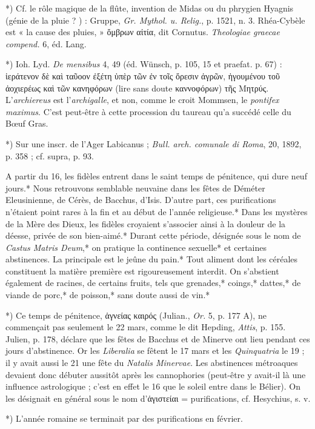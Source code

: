 \documentclass[a4paper, 11pt, oneside, polutonikogreek, french]{article}
\begin{document}
*) Cf. le rôle magique de la flûte, invention de Midas ou du phrygien Hyagnis (génie de la pluie ? ) : Gruppe, \emph{Gr. Mythol. u. Relig.}, p. 1521, n. 3. Rhéa-Cybèle est « la cause des pluies, » ὄμβρων αἰτία, dit Cornutus. \emph{Theologiae graecae compend.} 6, éd. Lang.

*) Ioh. Lyd. \emph{De mensibus} 4, 49 (éd. Wünsch, p. 105, 15 et praefat. p. 67) : ἱεράτενον δὲ καὶ ταῦοον ἐξέτη ὑπὲρ τῶν ἐν τοῖς ὄρεσιν ἀγρῶν, ἡγουμένου τοῦ ἀοχιερέως καὶ τῶν κανηφόρων (lire sans doute καννοφόρων) τῆς Mητρύς. L'\emph{archiereus} est l'\emph{archigalle}, et non, comme le croit Mommsen, le \emph{pontifex maximus}. C'est peut-être à cette procession du taureau qu'a succédé celle du Bœuf Gras.

*) Sur une inscr. de l'Ager Labicanus ; \emph{Bull. arch. comunale di Roma}, 20, 1892, p. 358 ; cf. supra, p. 93.

A partir du 16, les fidèles entrent dans le saint temps de pénitence, qui dure neuf jours.* Nous retrouvons semblable neuvaine dans les fêtes de Déméter Eleusinienne, de Cérès, de Bacchus, d'Isis. D'autre part, ces purifications n'étaient point rares à la fin et au début de l'année religieuse.* Dans les mystères de la Mère des Dieux, les fidèles croyaient s'associer ainsi à la douleur de la déesse, privée de son bien-aimé.* Durant cette période, désignée sous le nom de \emph{Castus Matris Deum},* on pratique la continence sexuelle* et certaines abstinences. La principale est le jeûne du pain.* Tout aliment dont les céréales constituent la matière première est rigoureusement interdit. On s'abstient également de racines, de certains fruits, tels que grenades,* coings,* dattes,* de viande de porc,* de poisson,* sans doute aussi de vin.*

*) Ce temps de pénitence, ἁγνείας καιρός (Julian., \emph{Or.} 5, p. 177 A), ne commençait pas seulement le 22 mars, comme le dit Hepding, \emph{Attis}, p. 155. Julien, p. 178, déclare que les fêtes de Bacchus et de Minerve ont lieu pendant ces jours d'abstinence. Or les \emph{Liberalia} se fêtent le 17 mars et les \emph{Quinquatria} le 19 ; il y avait aussi le 21 une fête du \emph{Natalis Minervae}. Les abstinences métroaques devaient donc débuter aussitôt après les cannophories (peut-être y avait-il là une influence astrologique ; c'est en effet le 16 que le soleil entre dans le Bélier). On les désignait en général sous le nom d'ἁγιστείαι = purifications, cf. Hesychius, s. v.

*) L'année romaine se terminait par des purifications en février.
\end{document}
